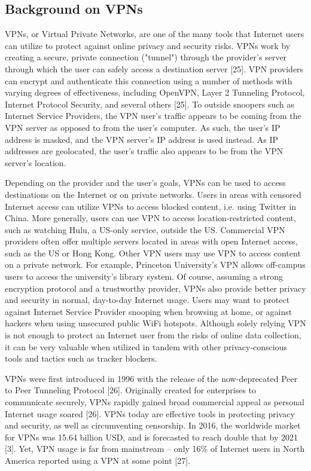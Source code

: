 \subsection{Background on VPNs}
VPNs, or Virtual Private Networks, are one of the many tools that Internet users can utilize to protect against online privacy and security risks. VPNs work by creating a secure, private connection ("tunnel") through the provider's server through which the user can safely access a destination server [25]. VPN providers can encrypt and authenticate this connection using a number of methods with varying degrees of effectiveness, including OpenVPN, Layer 2 Tunneling Protocol, Internet Protocol Security, and several others [25]. To outside snoopers such as Internet Service Providers, the VPN user's traffic appears to be coming from the VPN server as opposed to from the user's computer. As such, the user's IP address is masked, and the VPN server's IP address is used instead. As IP addresses are geolocated, the user's traffic also appears to be from the VPN server's location.

Depending on the provider and the user's goals, VPNs can be used to access destinations on the Internet or on private networks. Users in areas with censored Internet access can utilize VPNs to access blocked content, i.e. using Twitter in China. More generally, users can use VPN to access location-restricted content, such as watching Hulu, a US-only service, outside the US. Commercial VPN providers often offer multiple servers located in areas with open Internet access, such as the US or Hong Kong. Other VPN users may use VPN to access content on a private network. For example, Princeton University's VPN allows off-campus users to access the university's library system. Of course, assuming a strong encryption protocol and a trustworthy provider, VPNs also provide better privacy and security in normal, day-to-day Internet usage. Users may want to protect against Internet Service Provider snooping when browsing at home, or against hackers when using unsecured public WiFi hotspots. Although solely relying VPN is not enough to protect an Internet user from the risks of online data collection, it can be very valuable when utilized in tandem with other privacy-conscious tools and tactics such as tracker blockers.

VPNs were first introduced in 1996 with the release of the now-deprecated Peer to Peer Tunneling Protocol [26]. Originally created for enterprises to communicate securely, VPNs rapidly gained broad commercial appeal as personal Internet usage soared [26]. VPNs today are effective tools in protecting privacy and security, as well as circumventing censorship. In 2016, the worldwide market for VPNs was 15.64 billion USD, and is forecasted to reach double that by 2021 [3]. Yet, VPN usage is far from mainstream -- only 16\% of Internet users in North America reported using a VPN at some point [27].
